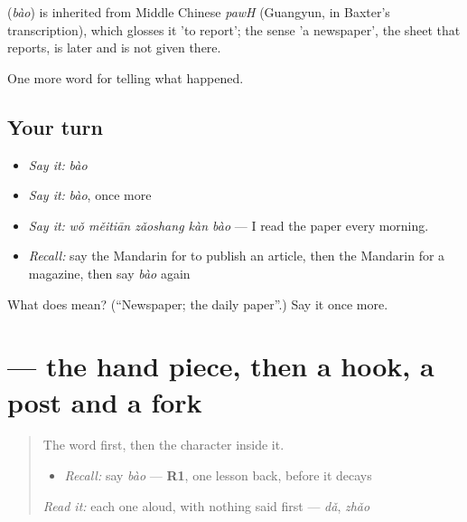 \begin{cousinweb}
\textbf{} (\emph{bào}) is inherited from Middle Chinese \emph{pawH} (Guangyun, in Baxter's transcription), which glosses it 'to report'; the sense 'a newspaper', the sheet that reports, is later and is not given there.
\end{cousinweb}

\begin{grammarlens}[title={What you've built}]
One more word for telling what happened.
\end{grammarlens}

\subsection*{Your turn}
\begin{itemize}
\raggedright
  \item \emph{Say it:} \emph{bào}
  \item \emph{Say it:} \emph{bào}, once more
  \item \emph{Say it:} \emph{wǒ měitiān zǎoshang kàn bào} — I read the paper every morning.
  \item \emph{Recall:} say the Mandarin for to publish an article, then the Mandarin for a magazine, then say \emph{bào} again
\end{itemize}

\begin{tcolorbox}[breakable,colback=teal!4,colframe=teal!35!black,title={Before you move on}]
What does  mean? (\textquotedblleft{}Newspaper; the daily paper\textquotedblright{}.) Say it once more.
\end{tcolorbox}
\section[\texorpdfstring{\zh{报} (bào)}{报 (bào)}]{ — the hand piece, then a hook, a post and a fork}

\label{lesson:ZH-W293-bao-report}



\begin{quote}
The word first, then the character inside it.

\begin{itemize}
\raggedright
  \item \emph{Recall:} say \emph{bào} — \textbf{R1}, one lesson back, before it decays
\end{itemize}

\begin{quote}
 
\end{quote}

\emph{Read it:} each one aloud, with nothing said first — \emph{dǎ}, \emph{zhǎo}
\end{quote}

